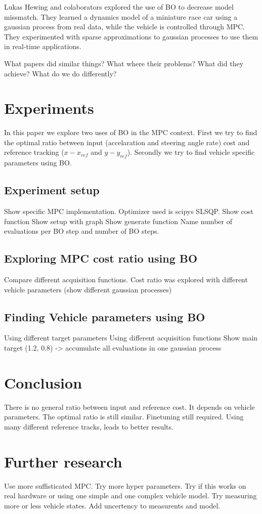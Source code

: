 \documentclass[twoside,twocolumn]{article}
\begin{document}
Lukas Hewing and colaborators \cite{hewing2018cautious} explored the use of BO to decrease model missmatch. They learned a dynamics model of a miniature race car using a gaussian process from real data, while the vehicle is controlled through MPC. They experimented with sparse approximations to gaussian processes to use them in real-time applications.

What papers did similar things?
What where their problems?
What did they achieve?
What do we do differently?

\section{Experiments}

In this paper we explore two uses of BO in the MPC context. First we try to find the optimal ratio between input (accelaration and steering angle rate) cost and reference tracking ($x - x_{ref}$ and $y - y_{ref}$). Secondly we try to find vehicle specific parameters using BO.
\subsection{Experiment setup}
Show specific MPC implementation. Optimizer used is scipys SLSQP.
Show cost function
Show setup with graph
Show generate function
Name number of evaluations per BO step and number of BO steps.

\subsection{Exploring MPC cost ratio using BO}
Compare different acquisition functions.
Cost ratio was explored with different vehicle parameters (show different gaussian processes)

\subsection{Finding Vehicle parameters using BO}
Using different target parameters
Using different acquisition functions
Show main target (1.2, 0.8) -> accumulate all evaluations in one gaussian process

\section{Conclusion}
There is no general ratio between input and reference cost. It depends on vehicle parameters. The optimal ratio is still similar.
Finetuning still required. Using many different reference tracks, leads to better results.

\section{Further research}
Use more suffisticated MPC. Try more hyper parameters. Try if this works on real hardware or using one simple and one complex vehicle model. Try measuring more or less vehicle states. Add uncertency to measurents and model.



\end{document}
